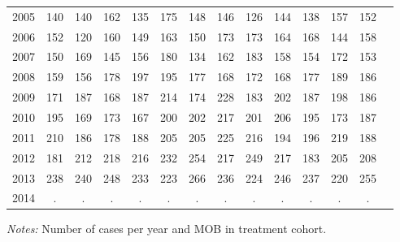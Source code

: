 \begin{table}[H]
\begin{threeparttable}
{\begin{tabular}{l*{13}{c}}
2005        &         140&         140&         162&         135&         175&         148&         146&         126&         144&         138&         157&         152\\
2006        &         152&         120&         160&         149&         163&         150&         173&         173&         164&         168&         144&         158\\
2007        &         150&         169&         145&         156&         180&         134&         162&         183&         158&         154&         172&         153\\
2008        &         159&         156&         178&         197&         195&         177&         168&         172&         168&         177&         189&         186\\
2009        &         171&         187&         168&         187&         214&         174&         228&         183&         202&         187&         198&         186\\
2010        &         195&         169&         173&         167&         200&         202&         217&         201&         206&         195&         173&         187\\
2011        &         210&         186&         178&         188&         205&         205&         225&         216&         194&         196&         219&         188\\
2012        &         181&         212&         218&         216&         232&         254&         217&         249&         217&         183&         205&         208\\
2013        &         238&         240&         248&         233&         223&         266&         236&         224&         246&         237&         220&         255\\
2014        &           .&           .&           .&           .&           .&           .&           .&           .&           .&           .&           .&           .\\
 \bottomrule \end{tabular} } \begin{tablenotes} \item \scriptsize \emph{Notes:} Number of cases per year and MOB in treatment cohort. \end{tablenotes} \end{threeparttable} \end{table} 
